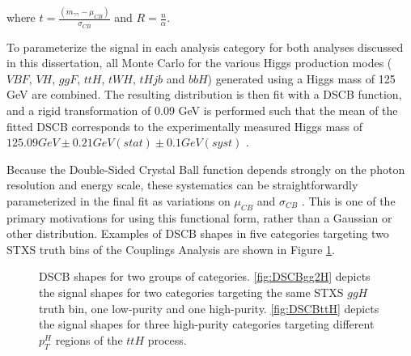 where $t = \frac{(m_{\gamma \gamma} - \mu_{CB})}{\sigma_{CB}}$ and $R = \frac{n}{\alpha}$. 

To parameterize the signal in each analysis category for both analyses discussed in this dissertation, all Monte Carlo for the various Higgs production modes ($VBF$, $VH$, $ggF$, $ttH$, $tWH$, $tHjb$ and $bbH$) generated using a Higgs mass of 125 GeV are combined. The resulting distribution is then fit with a DSCB function, and a rigid transformation of 0.09 GeV is performed such that the mean of the fitted DSCB corresponds to the experimentally measured Higgs mass of $125.09 GeV \pm 0.21 GeV(stat) \pm 0.1 GeV(syst)$ \cite{Higgsmass}.

Because the Double-Sided Crystal Ball function depends strongly on the photon resolution and energy scale, these systematics can be straightforwardly parameterized in the final fit as variations on $\mu_{CB}$ and $\sigma_{CB}$ \cite{gammaID}. This is one of the primary motivations for using this functional form, rather than a Gaussian or other distribution. Examples of DSCB shapes in five categories targeting two STXS truth bins of the Couplings Analysis are shown in Figure \ref{fig:DSCB}.

\begin{figure}[h]
\centering
{}
\caption{DSCB shapes for two groups of categories. \ref{fig:DSCBgg2H} depicts the signal shapes for two categories targeting the same STXS $ggH$ truth bin, one low-purity and one high-purity. \ref{fig:DSCBttH} depicts the signal shapes for three high-purity categories targeting different $p_{T}^{H}$ regions of the $ttH$ process.}
\label{fig:DSCB}
\end{figure}

